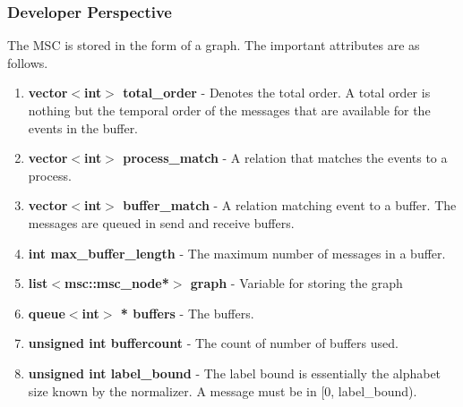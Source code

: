 \subsubsection*{Developer Perspective}
The MSC is stored in the form of a graph. The important attributes are as follows.
\begin{enumerate}
 \item \textbf{vector$<$int$>$ total\_order} - Denotes the total order. A total order is nothing but the temporal order of the messages that are available for the events in the buffer.
 \item \textbf{vector$<$int$>$ process\_match} - A relation that matches the events to a process.
 \item \textbf{vector$<$int$>$ buffer\_match} - A relation matching event to a buffer. The messages are queued in send and receive buffers.
 \item \textbf{int max\_buffer\_length} - The maximum number of messages in a buffer.
 \item \textbf{list$<$msc::msc\_node*$>$ graph} - Variable for storing the graph
 \item \textbf{queue$<$int$>$ * buffers} - The buffers.
 \item \textbf{unsigned int buffercount} - The count of number of buffers used.
 \item \textbf{unsigned int label\_bound} - The label bound is essentially the alphabet size known by the normalizer. A message must be in [0, label\_bound).
\end{enumerate}

